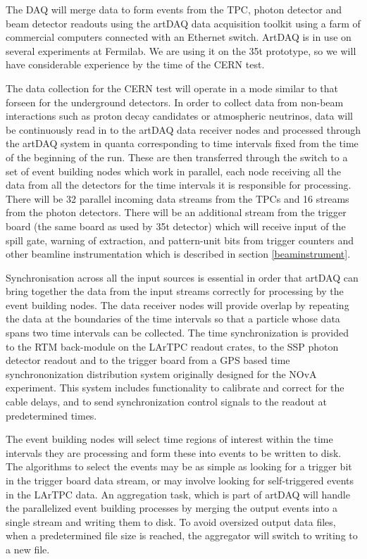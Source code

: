 The DAQ will merge data to form events from the TPC, 
photon detector and beam detector readouts using the 
artDAQ data acquisition toolkit using a farm of commercial 
computers connected with an Ethernet switch.  ArtDAQ is 
in use on several experiments at Fermilab.  We are using it
on the 35t prototype, so we will have considerable 
experience by the time of the CERN test.  

The data collection for the CERN test will operate in a mode 
similar to that forseen for the underground detectors. In order 
to collect data from non-beam interactions such as proton decay 
candidates or atmospheric neutrinos, data will be continuously
read in to the artDAQ data receiver nodes and processed through
the artDAQ system in quanta corresponding to time intervals fixed
from the time of the beginning of the run.  These are then 
transferred through the switch to a set of event building nodes 
which work in parallel, each node receiving all the data from all 
the detectors for the time intervals it is responsible for processing.
There will be 32 parallel incoming data streams from the TPCs
and 16 streams from the photon detectors.  There will be an additional
stream from the trigger board (the same board as used by 35t detector) 
which will receive input of the spill 
gate, warning of extraction, and pattern-unit bits from trigger counters
and other beamline instrumentation which is described in section \ref{beaminstrument}.

Synchronisation across all the input sources is essential in order 
that artDAQ can bring together the data from the input streams correctly for
processing by the event building nodes.  The data receiver nodes will provide
overlap by repeating the data at the boundaries of the time intervals so 
that a particle whose data spans two time intervals can be collected.  
The time synchronization is provided to the RTM back-module on the LArTPC 
readout crates, to the SSP photon detector readout and to the trigger board from
a GPS based time synchrononization distribution system originally designed 
for the NOvA experiment.  This system includes functionality to calibrate and 
correct for the cable delays, and to send synchronization control signals to
the readout at predetermined times.

The event building nodes will select time regions of interest within the time 
intervals they are processing and form these into events to be written to 
disk. The algorithms to select the events may be as simple as looking for 
a trigger bit in the trigger board data stream, or may involve looking 
for self-triggered events in the LArTPC data.  An aggregation task, which 
is part of artDAQ will handle the parallelized event building processes by 
merging the output events into a single stream and writing them to disk.
To avoid oversized output data files, when a predetermined file size is reached, 
the aggregator will switch to writing to a new file.  

